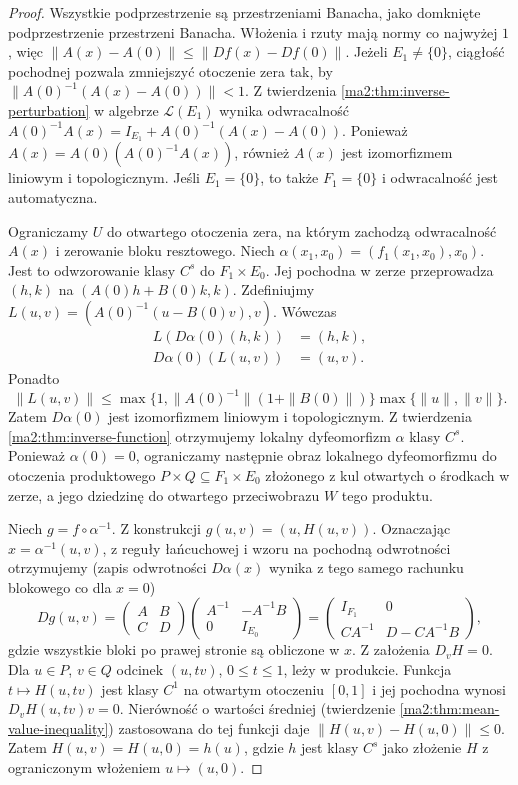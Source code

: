 \begin{proof}
Wszystkie podprzestrzenie są przestrzeniami Banacha,
jako domknięte podprzestrzenie przestrzeni Banacha.
Włożenia i rzuty mają normy co najwyżej $1$, więc
$\|A(x)-A(0)\|\le\|Df(x)-Df(0)\|$.
Jeżeli $E_1\ne\{0\}$, ciągłość pochodnej pozwala
zmniejszyć otoczenie zera tak, by
$\|A(0)^{-1}(A(x)-A(0))\|<1$.
Z twierdzenia \ref{ma2:thm:inverse-perturbation}
w algebrze $\mathcal L(E_1)$ wynika odwracalność
$A(0)^{-1}A(x)=I_{E_1}+A(0)^{-1}(A(x)-A(0))$.
Ponieważ $A(x)=A(0)(A(0)^{-1}A(x))$, również
$A(x)$ jest izomorfizmem liniowym i topologicznym.
Jeśli $E_1=\{0\}$, to także $F_1=\{0\}$ i
odwracalność jest automatyczna.

Ograniczamy $U$ do otwartego otoczenia zera, na którym
zachodzą odwracalność $A(x)$ i zerowanie bloku resztowego.
Niech $\alpha(x_1,x_0)=(f_1(x_1,x_0),x_0)$.
Jest to odwzorowanie klasy $C^s$ do $F_1\times E_0$.
Jej pochodna w zerze przeprowadza $(h,k)$ na
$(A(0)h+B(0)k,k)$. Zdefiniujmy
$L(u,v)=(A(0)^{-1}(u-B(0)v),v)$.
Wówczas
\[
 \begin{aligned}
 L(D\alpha(0)(h,k))&=(h,k),\\
 D\alpha(0)(L(u,v))&=(u,v).
 \end{aligned}
\]
Ponadto
\[
 \|L(u,v)\|\le
 \max\{1,\|A(0)^{-1}\|(1+\|B(0)\|)\}
 \max\{\|u\|,\|v\|\}.
\]
Zatem $D\alpha(0)$ jest izomorfizmem liniowym
i topologicznym. Z twierdzenia
\ref{ma2:thm:inverse-function} otrzymujemy lokalny
dyfeomorfizm $\alpha$ klasy $C^s$.
Ponieważ $\alpha(0)=0$, ograniczamy następnie obraz
lokalnego dyfeomorfizmu do otoczenia produktowego
$P\times Q\subseteq F_1\times E_0$ złożonego z kul
otwartych o środkach w zerze, a jego dziedzinę
do otwartego przeciwobrazu $W$ tego produktu.

Niech $g=f\circ\alpha^{-1}$. Z konstrukcji
$g(u,v)=(u,H(u,v))$. Oznaczając $x=\alpha^{-1}(u,v)$,
z reguły łańcuchowej i wzoru na pochodną odwrotności
otrzymujemy (zapis odwrotności $D\alpha(x)$ wynika
z tego samego rachunku blokowego co dla $x=0$)
\[
 Dg(u,v)=
 \begin{pmatrix}A&B\\C&D\end{pmatrix}
 \begin{pmatrix}A^{-1}&-A^{-1}B\\0&I_{E_0}\end{pmatrix}
 =
 \begin{pmatrix}I_{F_1}&0\\CA^{-1}&D-CA^{-1}B\end{pmatrix},
\]
gdzie wszystkie bloki po prawej stronie są obliczone
w $x$. Z założenia $D_vH=0$.
Dla $u\in P$, $v\in Q$ odcinek $(u,tv)$,
$0\le t\le1$, leży w produkcie.
Funkcja $t\mapsto H(u,tv)$ jest klasy $C^1$
na otwartym otoczeniu $[0,1]$ i jej pochodna
wynosi $D_vH(u,tv)v=0$. Nierówność o wartości
średniej (twierdzenie \ref{ma2:thm:mean-value-inequality})
zastosowana do tej funkcji daje
$\|H(u,v)-H(u,0)\|\le0$.
Zatem $H(u,v)=H(u,0)=h(u)$, gdzie $h$ jest klasy $C^s$
jako złożenie $H$ z ograniczonym włożeniem $u\mapsto(u,0)$.


\end{proof}
